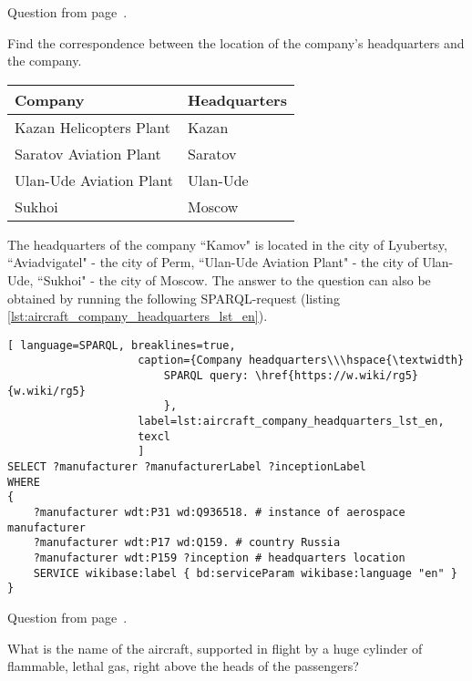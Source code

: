 Question from page~\pageref{question:aircraft_question_2}.


\begin{exercise}%
    \label{answer:aircraft_company_headquarters_en}
Find the correspondence between the location of the company's headquarters and the company.
\\
\begin{tabular}{ l | l }
Company & Headquarters \\ \hline
Kazan Helicopters Plant & Kazan \\
Saratov Aviation Plant & Saratov \\
Ulan-Ude Aviation Plant & Ulan-Ude \\
Sukhoi & Moscow \\
\end{tabular}
\end{exercise}

The headquarters of the company ``Kamov" is located in the city of Lyubertsy, ``Aviadvigatel" - the city of Perm, ``Ulan-Ude Aviation Plant" - the city of Ulan-Ude, ``Sukhoi" - the city of Moscow. The answer to the question can also be obtained by running the following SPARQL-request (listing \ref{lst:aircraft_company_headquarters_lst_en}). 
          
\begin{lstlisting}[ language=SPARQL, breaklines=true, 
                    caption={Company headquarters\\\hspace{\textwidth}
                        SPARQL query: \href{https://w.wiki/rg5}{w.wiki/rg5}
                        },
                    label=lst:aircraft_company_headquarters_lst_en,
                    texcl 
                    ]
SELECT ?manufacturer ?manufacturerLabel ?inceptionLabel
WHERE
{
    ?manufacturer wdt:P31 wd:Q936518. # instance of aerospace manufacturer
  	?manufacturer wdt:P17 wd:Q159. # country Russia
  	?manufacturer wdt:P159 ?inception # headquarters location
    SERVICE wikibase:label { bd:serviceParam wikibase:language "en" }
}
\end{lstlisting}

Question from page~\pageref{question:aircraft_question_3}.


\begin{exercise}%
    \label{answer:aircraft_question_airship_en}
What is the name of the aircraft, supported in flight by a huge cylinder of flammable, lethal gas, right above the heads of the passengers?
\end{exercise}

